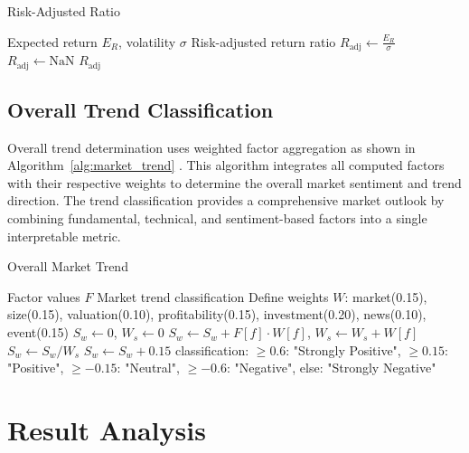 \documentclass[3p,times,procedia]{elsarticle}
\begin{document}
\begin{algorithm}[H]\footnotesize\setlength{\abovecaptionskip}{-2pt}
\caption{Risk-Adjusted Ratio}
\label{alg:risk_adjusted}
\begin{algorithmic}[1]
    \Require Expected return $E_R$, volatility $\sigma$
    \Ensure Risk-adjusted return ratio
        \State $R_{\text{adj}} \gets \frac{E_R}{\sigma}$
    \Else
        \State $R_{\text{adj}} \gets \text{NaN}$
    \EndIf
    \State \Return $R_{\text{adj}}$
\end{algorithmic}
\end{algorithm}

\subsection{Overall Trend Classification}
\vspace{-2pt}
Overall trend determination uses weighted factor aggregation as shown in Algorithm~\ref{alg:market_trend} \cite{Carhart1997}. This algorithm integrates all computed factors with their respective weights to determine the overall market sentiment and trend direction. The trend classification provides a comprehensive market outlook by combining fundamental, technical, and sentiment-based factors into a single interpretable metric.

\begin{algorithm}[H]\footnotesize\setlength{\abovecaptionskip}{-2pt}
\caption{Overall Market Trend}
\label{alg:market_trend}
\begin{algorithmic}[1]
    \Require Factor values $F$
    \Ensure Market trend classification
    \State Define weights $W$: market(0.15), size(0.15), valuation(0.10), profitability(0.15), investment(0.20), news(0.10), event(0.15)
    \State $S_w \gets 0$, $W_s \gets 0$
            \State $S_w \gets S_w + F[f] \cdot W[f]$, $W_s \gets W_s + W[f]$
        \EndIf
    \EndFor
     \State $S_w \gets S_w / W_s$ \EndIf
    \State $S_w \gets S_w + 0.15$ 
    \State \Return classification: $\geq 0.6$: "Strongly Positive", $\geq 0.15$: "Positive", $\geq -0.15$: "Neutral", $\geq -0.6$: "Negative", else: "Strongly Negative"
\end{algorithmic}
\end{algorithm}

\section{Result Analysis}
\vspace{-3pt}
\end{document}
